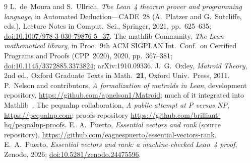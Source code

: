 \documentclass[11pt]{amsart}
\theoremstyle{definition}
\theoremstyle{remark}
\begin{document}
\begin{thebibliography}{9}
 L.~de~Moura and S.~Ullrich, \emph{The Lean~4 theorem prover and programming
  language}, in Automated Deduction---CADE~28 (A.~Platzer and G.~Sutcliffe, eds.), Lecture
  Notes in Comput.\ Sci., Springer, 2021, pp.~625--635;
  \href{https://doi.org/10.1007/978-3-030-79876-5_37}{doi:10.1007/978-3-030-79876-5\_37}.
 The mathlib Community, \emph{The Lean mathematical library}, in Proc.\ 9th
  ACM SIGPLAN Int.\ Conf.\ on Certified Programs and Proofs (CPP~2020), 2020, pp.~367--381;
  \href{https://doi.org/10.1145/3372885.3373824}{doi:10.1145/3372885.3373824}; arXiv:1910.09336.
 J.~G.~Oxley, \emph{Matroid Theory}, 2nd ed., Oxford Graduate Texts in Math.\
  \textbf{21}, Oxford Univ.\ Press, 2011.
 P.~Nelson and contributors, \emph{A formalization of matroids in Lean},
  development repository, \url{https://github.com/apnelson1/Matroid}; much of it integrated
  into Mathlib~\cite{Mathlib}.
 The pequalnp collaboration, \emph{A public attempt at P versus NP},
  \url{https://pequalnp.com}; proofs repository \url{https://github.com/brilliant-hq/pequalnp-proofs}.
\bibitem{Repo} E.~A.~Puerto, \emph{Essential vectors and rank} (source repository),
  \url{https://github.com/eagnespuerto/essential-vectors-rank}.
 E.~A.~Puerto, \emph{Essential vectors and rank: a machine-checked Lean~4
  proof}, Zenodo, 2026; \href{https://doi.org/10.5281/zenodo.24475596}{doi:10.5281/zenodo.24475596}.
\end{thebibliography}
\end{document}
